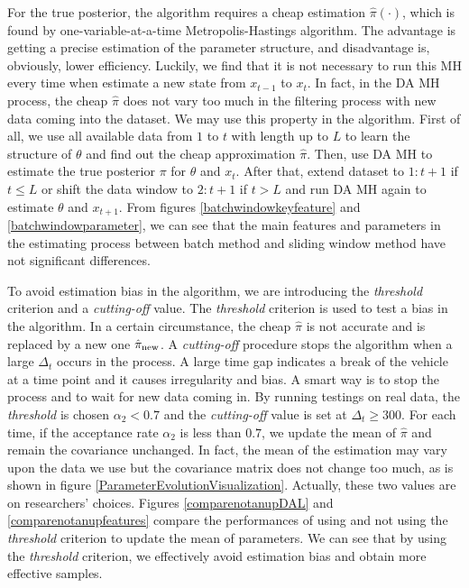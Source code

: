 For the true posterior, the algorithm requires a cheap estimation $\hat{\pi}(\cdot)$, which is found by one-variable-at-a-time Metropolis-Hastings algorithm. The advantage is getting a precise estimation of the parameter structure, and disadvantage is, obviously, lower efficiency. Luckily, we find that it is not necessary to run this MH every time when estimate a new state from $x_{t-1}$ to $x_t$. In fact, in the DA MH process, the cheap $\hat{\pi}$ does not vary too much in the filtering process with new data coming into the dataset. We may use this property in the algorithm. First of all, we use all available data from $1$ to $t$ with length up to $L$ to learn the structure of $\theta$ and find out the cheap approximation $\hat{\pi}$. Then, use DA MH to estimate the true posterior $\pi$ for $\theta$ and $x_t$. After that, extend dataset to $1:t+1$ if $t\leq L$ or shift the data window to $2:t+1$ if $t>L$ and run DA MH again to estimate $\theta$ and $x_{t+1}$. From figures \ref{batchwindowkeyfeature} and \ref{batchwindowparameter}, we can see that the main features and parameters in the estimating process between batch method and sliding window method have not significant differences. 


To avoid estimation bias in the algorithm, we are introducing the \textit{threshold} criterion and a \textit{cutting-off} value. The \textit{threshold} criterion is used to test  a bias in the algorithm. In a certain circumstance, the cheap $\hat{\pi}$ is not accurate and is replaced by a new one $\hat{\pi}_{\mbox{\scriptsize new}}$. A \textit{cutting-off} procedure stops the algorithm when a large $\Delta_t$ occurs in the process. A large time gap indicates a break of the vehicle at a time point and it causes irregularity and bias. A smart way is to stop the process and to wait for new data coming in. By running testings on real data, the \textit{threshold} is chosen $\alpha_2<0.7$ and the \textit{cutting-off} value is set at $\Delta_t\geq 300$. For each time, if the acceptance rate $\alpha_2$ is less than $0.7$, we update the mean of $\hat{\pi}$ and remain the covariance unchanged. In fact, the mean of the estimation may vary upon the data we use but the covariance matrix does not change too much, as is shown in figure \ref{ParameterEvolutionVisualization}. Actually, these two values are on researchers' choices. Figures \ref{comparenotanupDAL} and \ref{comparenotanupfeatures} compare the performances of using and not using the \textit{threshold} criterion to update the mean of parameters. We can see that by using the \textit{threshold} criterion, we effectively avoid estimation bias and obtain more effective samples. 

